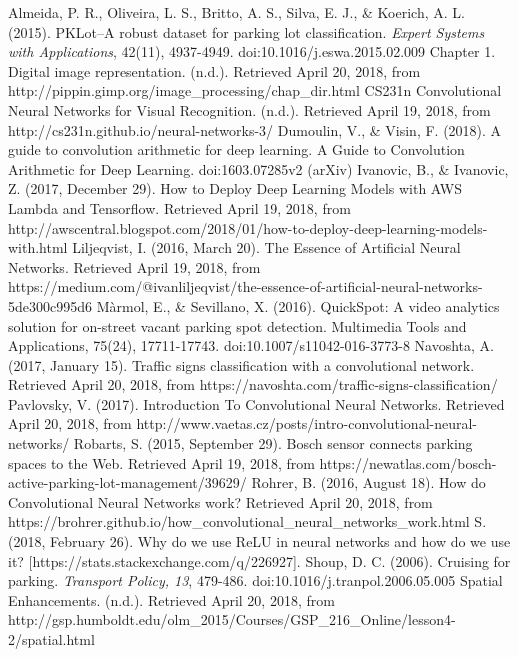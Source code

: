 \documentclass[a4paper, 11pt]{article} %
\begin{document}
\begin{thebibliography}{unsrt}
		Almeida, P. R., Oliveira, L. S., Britto, A. S., Silva, E. J., \& Koerich, A. L. (2015). PKLot--A robust 
		dataset for parking lot classification. \textit{Expert Systems with Applications}, 42(11), 
		4937-4949. doi:10.1016/j.eswa.2015.02.009
		Chapter 1. Digital image representation. (n.d.). Retrieved April 20, 2018, from 
		http://pippin.gimp.org/image\_processing/chap\_dir.html
		CS231n Convolutional Neural Networks for Visual Recognition. (n.d.). Retrieved April 19, 2018, 
		from http://cs231n.github.io/neural-networks-3/
		Dumoulin, V., \& Visin, F. (2018). A guide to convolution arithmetic for deep learning. A Guide to
		Convolution Arithmetic for Deep Learning. doi:1603.07285v2 (arXiv)
		Ivanovic, B., \& Ivanovic, Z. (2017, December 29). How to Deploy Deep Learning Models with AWS 
		Lambda and Tensorflow. Retrieved April 19, 2018, from 
		http://awscentral.blogspot.com/2018/01/how-to-deploy-deep-learning-models-with.html
		Liljeqvist, I. (2016, March 20). The Essence of Artificial Neural Networks. Retrieved April 19, 2018, 
		from https://medium.com/@ivanliljeqvist/the-essence-of-artificial-neural-networks-5de300c995d6
		M\`armol, E., \& Sevillano, X. (2016). QuickSpot: A video analytics solution for on-street vacant 
		parking spot detection. Multimedia Tools and Applications, 75(24), 17711-17743. 
		doi:10.1007/s11042-016-3773-8
		Navoshta, A. (2017, January 15). Traffic signs classification with a convolutional network. 
		Retrieved April 20, 2018, from https://navoshta.com/traffic-signs-classification/
		Pavlovsky, V. (2017). Introduction To Convolutional Neural Networks. Retrieved April 20, 2018, 
		from http://www.vaetas.cz/posts/intro-convolutional-neural-networks/
		Robarts, S. (2015, September 29). Bosch sensor connects parking spaces to the Web. Retrieved 
		April 19, 2018, from https://newatlas.com/bosch-active-parking-lot-management/39629/
		Rohrer, B. (2016, August 18). How do Convolutional Neural Networks work? Retrieved April 20, 
		2018, from https://brohrer.github.io/how\_convolutional\_neural\_networks\_work.html
		S. (2018, February 26). Why do we use ReLU in neural networks and how do we use it? 
		[https://stats.stackexchange.com/q/226927].
        Shoup, D. C. (2006). Cruising for parking. \textit{Transport Policy, 13}, 479-486. doi:10.1016/j.tranpol.2006.05.005
		Spatial Enhancements. (n.d.). Retrieved April 20, 2018, from 
		http://gsp.humboldt.edu/olm\_2015/Courses/GSP\_216\_Online/lesson4-2/spatial.html

\end{thebibliography}
\end{document}
